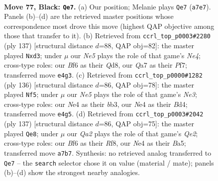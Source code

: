 \documentclass[11pt]{article}
\begin{document}
\clearpage

\begin{figure}[p]\centering
\begin{subfigure}{0.46\textwidth}\centering
\resizebox{\linewidth}{!}{%
\newchessgame
\chessboard[
  setfen={1r6/q5k1/5b2/P1pQ1p2/3pnPp1/8/R2BP3/3NK3 b - - 15 77},
  showmover=false,
  pgfstyle=straightmove, color=movearrow, markmove={a7-e7}
]}
\caption{}
\end{subfigure}\hfill
\begin{subfigure}{0.46\textwidth}\centering
\resizebox{\linewidth}{!}{%
\newchessgame
\chessboard[
  setfen={3q2k1/5p2/5bp1/4n3/1P1p1QP1/p2B1P2/P7/3R3K b - - 0 69},
  showmover=false,
  pgfstyle=straightmove, color=movearrow, markmove={e5-d3}
]}
\caption{}
\end{subfigure}
\\[4pt]
\begin{subfigure}{0.46\textwidth}\centering
\resizebox{\linewidth}{!}{%
\newchessgame
\chessboard[
  setfen={1b6/6pk/5p1p/8/3BP1P1/1b1qNP1P/1Q4K1/8 w - - 9 69},
  showmover=false,
  pgfstyle=straightmove, color=movearrow, markmove={e3-f5}
]}
\caption{}
\end{subfigure}\hfill
\begin{subfigure}{0.46\textwidth}\centering
\resizebox{\linewidth}{!}{%
\newchessgame
\chessboard[
  setfen={5r1k/4q3/1p1p3P/bQnPpBp1/4P1N1/R7/5PK1/8 b - - 6 69},
  showmover=false,
  pgfstyle=straightmove, color=movearrow, markmove={e7-e8}
]}
\caption{}
\end{subfigure}
\caption{\textbf{Move 77, Black: \texttt{Qe7}.} (a) Our position; Melanie plays \texttt{Qe7} (\texttt{a7e7}). Panels (b)--(d) are the retrieved master positions whose correspondence most drove this move (highest QAP objective among those that transfer to it). (b) Retrieved from \texttt{ccrl\_top\_p0003\#2280} (ply 137) [structural distance $d$=88, QAP obj=82]: the master played \texttt{Nxd3}; under $\mu$ our \emph{Ne5} plays the role of that game's \emph{Ne4}; cross-type roles: our \emph{B}f6 as their \emph{Q}d8, our \emph{Q}a7 as their \emph{P}f7; transferred move \texttt{e4g3}. (c) Retrieved from \texttt{ccrl\_top\_p0000\#1282} (ply 136) [structural distance $d$=86, QAP obj=78]: the master played \texttt{Nf5}; under $\mu$ our \emph{Ne5} plays the role of that game's \emph{Ne3}; cross-type roles: our \emph{N}e4 as their \emph{b}b3, our \emph{N}e4 as their \emph{B}d4; transferred move \texttt{e4g5}. (d) Retrieved from \texttt{ccrl\_top\_p0003\#2042} (ply 137) [structural distance $d$=86, QAP obj=75]: the master played \texttt{Qe8}; under $\mu$ our \emph{Qa2} plays the role of that game's \emph{Qe2}; cross-type roles: our \emph{B}f6 as their \emph{R}f8, our \emph{N}e4 as their \emph{B}a5; transferred move \texttt{a7b7}. Synthesis: no retrieved analog transferred to \texttt{Qe7} -- the \texttt{search} selector chose it on value (material / mate); panels (b)--(d) show the strongest nearby analogies.}
\label{fig:thought-m153}
\end{figure}
\end{document}
